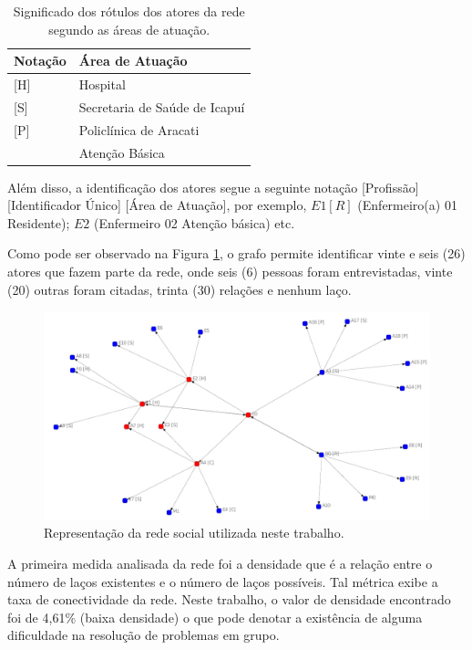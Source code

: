 \begin{table}[htbp]
\centering
\caption{Significado dos rótulos dos atores da rede segundo as áreas de atuação.}
\label{graph-place}
\begin{tabular}{|l|l|}
\hline
Notação & Área de Atuação                       \\ \hline
{[}H{]} & Hospital                      \\ \hline
{[}S{]} & Secretaria de Saúde de Icapuí \\ \hline
{[}P{]} & Policlínica de Aracati        \\ \hline
        & Atenção Básica                \\ \hline
\end{tabular}
\end{table}

Além disso, a identificação dos atores segue a seguinte notação [Profissão][Identificador Único] [Área de Atuação], por exemplo, $E1 [R]$ (Enfermeiro(a) 01 Residente); $E2$ (Enfermeiro 02 Atenção básica) etc.

Como pode ser observado na Figura \ref{fig:grafos}, o grafo permite identificar vinte e seis (26) atores que fazem parte da rede, onde seis (6) pessoas foram entrevistadas, vinte (20) outras foram citadas, trinta (30) relações e nenhum laço.

\begin{figure}[htbp]
\centering
 \includegraphics[width=.85\textwidth]{figuras/grafo-grupos.pdf}
 \caption{Representação da rede social utilizada neste trabalho.}
\label{fig:grafos}
\end{figure}

A primeira medida analisada da rede foi a densidade que é a relação entre o número de laços existentes e o número de laços possíveis. Tal métrica exibe a taxa de conectividade da rede. Neste trabalho, o valor de densidade encontrado foi de 4,61\% (baixa densidade) o que pode denotar a existência de alguma dificuldade na resolução de problemas em grupo.

